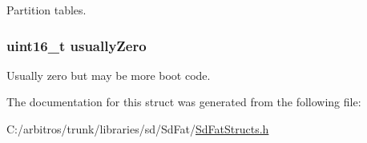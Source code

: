 Partition tables. \hypertarget{structmaster_boot_record_aefe56bef1bc942c24bc7eefc4a7aefcc}{
\subsubsection[{usually\-Zero}]{\setlength{\rightskip}{0pt plus 5cm}uint16\-\_\-t usually\-Zero}}\label{structmaster_boot_record_aefe56bef1bc942c24bc7eefc4a7aefcc}
Usually zero but may be more boot code. 

The documentation for this struct was generated from the following file\-:\begin{DoxyCompactItemize}
\item 
C\-:/arbitros/trunk/libraries/sd/\-Sd\-Fat/\hyperlink{_sd_fat_structs_8h}{Sd\-Fat\-Structs.\-h}\end{DoxyCompactItemize}
